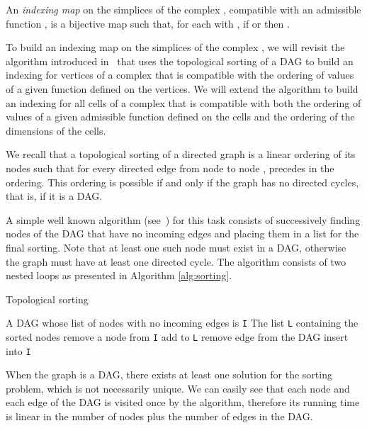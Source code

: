 \documentclass[12pt]{article}
\begin{document}
An {\em indexing map} on the simplices of the complex , compatible with an admissible function , is a bijective map  such that, for each
 with , if  or  then .

To build an indexing map  on the simplices of the complex , we will revisit the algorithm introduced in~\cite{AlKaLa17} that uses the topological sorting of a DAG
to build an indexing for vertices of a complex that is compatible with the ordering of values of a given function defined on the vertices.
We will extend the algorithm to build an indexing for all cells of a complex that is compatible with both the ordering of values of a given admissible
function defined on the cells and the ordering of the dimensions of the cells.

We recall that a topological sorting of a directed graph is a linear ordering of its nodes such that for every directed edge
 from node  to node ,  precedes  in the ordering. This ordering is possible if and only if the graph
has no directed cycles, that is, if it is a  DAG.

A simple well known algorithm (see~\cite{Wikipedia14,Kahn62}) for this task consists
of successively finding nodes of the DAG that have no incoming edges and placing them in a list for the final sorting. Note that
at least one such node must exist in a DAG, otherwise the graph must have at least one directed cycle.
The algorithm consists of two nested loops as presented in Algorithm \ref{alg:sorting}.

\begin{algorithm}
\caption{Topological sorting}
\label{alg:sorting}
\begin{algorithmic}[1]
 A DAG whose list of nodes with no incoming edges is  \texttt{I}
 The list \texttt{L} containing the sorted nodes
\STATE remove a node  from \texttt{I}
\STATE add  to \texttt{L}
\STATE remove edge  from the DAG
\STATE insert  into \texttt{I}
\ENDIF
\ENDFOR
\ENDWHILE
\end{algorithmic}
\end{algorithm}

When the graph is a DAG, there exists at least one solution for the sorting problem, which is not necessarily unique.
We can easily see that each node and each edge of the DAG is visited once by the algorithm, therefore its running time
is linear in the number of nodes plus the number of edges in the DAG.
\end{document}
